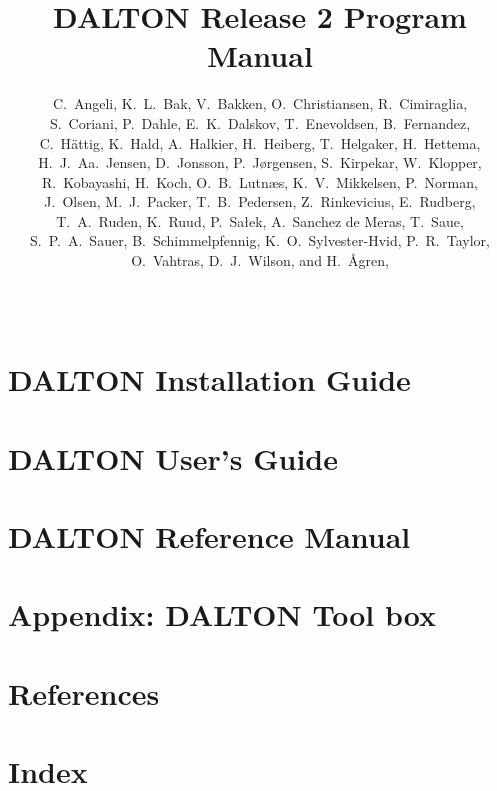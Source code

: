 \documentclass[11pt]{report}
\begin{document}
%

%
\baselineskip=15pt
%
\title{DALTON Release 2 Program Manual}

%
\author{C.~Angeli,
K.~L.~Bak,
V.~Bakken,
O.~Christiansen,
R.~Cimiraglia,\\
S.~Coriani,
P.~Dahle,
E.~K.~Dalskov,
T.~Enevoldsen,
B.~Fernandez,\\
C.~H{\"a}ttig,
K.~Hald,
A.~Halkier,
H.~Heiberg,
T.~Helgaker,
H.~Hettema,\\
H.~J.~Aa.~Jensen,
D.~Jonsson,
P.~J{\o}rgensen,
S.~Kirpekar,
W.~Klopper,\\
R.~Kobayashi,
H.~Koch,
O.~B.~Lutn\ae s,
K.~V.~Mikkelsen,
P.~Norman,\\
J.~Olsen,
M.~J.~Packer,
T.~B.~Pedersen,
Z.~Rinkevicius,
E.~Rudberg,\\
T.~A.~Ruden,
K.~Ruud,
P.~Sa\l ek,
A.~Sanchez de Meras,
T.~Saue,\\
S.~P.~A.~Sauer,
B.~Schimmelpfennig,
K.~O.~Sylvester-Hvid,
P.~R.~Taylor,\\
O.~Vahtras,
D.~J.~Wilson,
and H.~{\AA}gren,
}
%
\date{\mbox{\ }}
%
\maketitle
%



\part{DALTON Installation Guide}


\part{DALTON User's Guide}
















\part{DALTON Reference Manual}




















%


\part{Appendix: DALTON Tool box}

\part{References}

%
\part{Index}
\printindex
\end{document}
